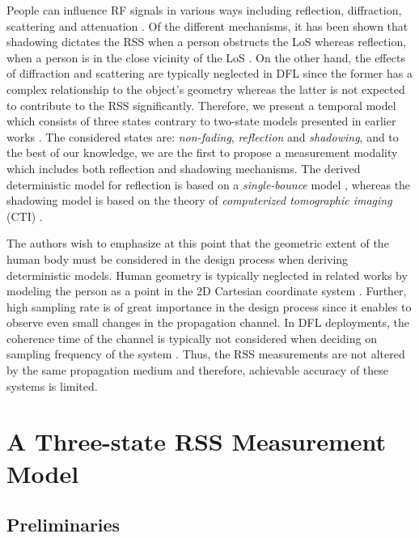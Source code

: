 \documentclass[journal, 10pt, twocolumn, balance]{IEEEtran}
\begin{document}
People can influence RF signals in various ways including reflection, diffraction, scattering and attenuation \cite[Ch. 4]{Molisch2010}. Of the different mechanisms, it has been shown that shadowing dictates the RSS when a person obstructs the LoS \cite{patwari08} whereas reflection, when a person is in the close vicinity of the LoS \cite{patwari2011b}. On the other hand, the effects of diffraction and scattering are typically neglected in DFL since the former has a complex relationship to the object’s geometry \cite{patwari2011b} whereas the latter is not expected to contribute to the RSS significantly. Therefore, we present a temporal model which consists of three states contrary to two-state models presented in earlier works \cite{Wilson2012, Zheng2012}. The considered states are: \emph{non-fading}, \emph{reflection} and \emph{shadowing}, and to the best of our knowledge, we are the first to propose a measurement modality which includes both reflection and shadowing mechanisms. The derived deterministic model for reflection is based on a \emph{single-bounce} model \cite[pp. 114-125]{rappaport1996}, whereas the shadowing model is based on the theory of \emph{computerized tomographic imaging} (CTI) \cite[Ch. 3]{Kak1988}. 

The authors wish to emphasize at this point that the geometric extent of the human body must be considered in the design process when deriving deterministic models. Human geometry is typically neglected in related works by modeling the person as a point in the 2D Cartesian coordinate system \cite{li2011,Zheng2012,Guo2013}. Further, high sampling rate is of great importance in the design process since it enables to observe even small changes in the propagation channel. In DFL deployments, the coherence time of the channel is  typically not considered when deciding on sampling frequency of the system \cite{Wilson2012, li2011, Kaltiokallio2012, Kaltiokallio2013}. Thus, the RSS measurements are not altered by the same propagation medium and therefore, achievable accuracy of these systems is limited.

\section{A Three-state RSS Measurement Model} \label{S:model}
\subsection{Preliminaries}
\end{document}
